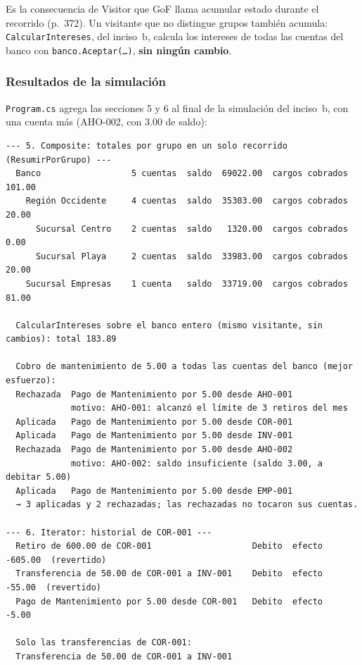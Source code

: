 Es la consecuencia de Visitor que GoF llama acumular estado durante el recorrido (p.~372). Un
visitante que no distingue grupos también acumula: \texttt{CalcularIntereses}, del inciso~b,
calcula los intereses de todas las cuentas del banco con \texttt{banco.Aceptar(\ldots)},
\textbf{sin ningún cambio}.

\subsubsection{Resultados de la simulación}

\texttt{Program.cs} agrega las secciones 5 y 6 al final de la simulación del inciso~b, con una
cuenta más (AHO-002, con 3.00 de saldo):

\begin{lstlisting}[language={}, numbers=none, basicstyle=\ttfamily\scriptsize, columns=fullflexible, keepspaces=true]
--- 5. Composite: totales por grupo en un solo recorrido (ResumirPorGrupo) ---
  Banco                  5 cuentas  saldo  69022.00  cargos cobrados 101.00
    Región Occidente     4 cuentas  saldo  35303.00  cargos cobrados  20.00
      Sucursal Centro    2 cuentas  saldo   1320.00  cargos cobrados   0.00
      Sucursal Playa     2 cuentas  saldo  33983.00  cargos cobrados  20.00
    Sucursal Empresas    1 cuenta   saldo  33719.00  cargos cobrados  81.00

  CalcularIntereses sobre el banco entero (mismo visitante, sin cambios): total 183.89

  Cobro de mantenimiento de 5.00 a todas las cuentas del banco (mejor esfuerzo):
  Rechazada  Pago de Mantenimiento por 5.00 desde AHO-001
             motivo: AHO-001: alcanzó el límite de 3 retiros del mes
  Aplicada   Pago de Mantenimiento por 5.00 desde COR-001
  Aplicada   Pago de Mantenimiento por 5.00 desde INV-001
  Rechazada  Pago de Mantenimiento por 5.00 desde AHO-002
             motivo: AHO-002: saldo insuficiente (saldo 3.00, a debitar 5.00)
  Aplicada   Pago de Mantenimiento por 5.00 desde EMP-001
  → 3 aplicadas y 2 rechazadas; las rechazadas no tocaron sus cuentas.

--- 6. Iterator: historial de COR-001 ---
  Retiro de 600.00 de COR-001                    Debito  efecto  -605.00  (revertido)
  Transferencia de 50.00 de COR-001 a INV-001    Debito  efecto   -55.00  (revertido)
  Pago de Mantenimiento por 5.00 desde COR-001   Debito  efecto    -5.00

  Solo las transferencias de COR-001:
  Transferencia de 50.00 de COR-001 a INV-001
\end{lstlisting}

